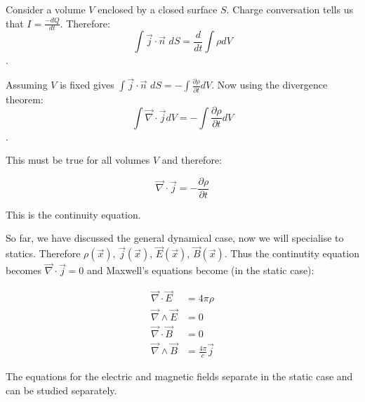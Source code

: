 Consider a volume $V$ enclosed by a closed surface $S$. Charge conversation tells us that $I = \frac{-dQ}{dt}$. Therefore: $$\int \vec{j} \cdot \vec{n} \, \, dS = \frac{d}{dt} \int \rho dV$$.

Assuming $V$ is fixed gives $\int \vec{j} \cdot \vec{n} \, \, dS = - \int \frac{\partial \rho}{\partial t} dV$. Now using the divergence theorem: $$\int \vec{\nabla} \cdot \vec{j} dV = - \int \frac{\partial \rho}{\partial t} dV$$.

This must be true for all volumes $V$ and therefore:

$$\vec{\nabla} \cdot \vec{j} = - \frac{\partial \rho}{\partial t}$$

This is the continuity equation.

\vspace{\baselineskip}

So far, we have discussed the general dynamical case, now we will specialise to statics. Therefore $\rho(\vec{x})$, $\vec{j} (\vec{x})$, $\vec{E} (\vec{x})$, $\vec{B} (\vec{x})$. Thus the continutity equation becomes $\vec{\nabla} \cdot \vec{j} = 0$ and Maxwell's equations become (in the static case):

\begin{align*}
\vec{\nabla} \cdot \vec{E} &= 4 \pi \rho \\
\vec{\nabla} \wedge \vec{E} &= 0 \\
\vec{\nabla} \cdot \vec{B} &= 0 \\
\vec{\nabla} \wedge \vec{B} &= \frac{4 \pi}{c} \vec{j}
\end{align*}

The equations for the electric and magnetic fields separate in the static case and can be studied separately.